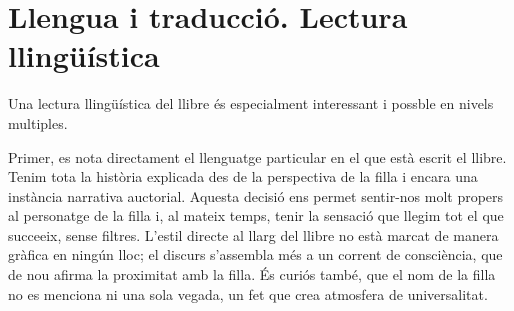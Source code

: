 \section{Llengua i traducció. Lectura llingüística}

Una lectura llingüística del llibre és especialment interessant i possble en nivels multiples.

Primer, es nota directament el llenguatge particular en el que està escrit el llibre.
Tenim tota la història explicada des de la perspectiva de la filla i encara una instància narrativa auctorial.
Aquesta decisió ens permet sentir-nos molt propers al personatge de la filla i, al mateix temps, tenir la sensació que llegim tot el que succeeix, sense filtres.
L'estil directe al llarg del llibre no està marcat de manera gràfica en ningún lloc; el discurs s'assembla més a un corrent de consciència, que de nou afirma la proximitat amb la filla.
És curiós també, que el nom de la filla no es menciona ni una sola vegada, un fet que crea atmosfera de universalitat.




